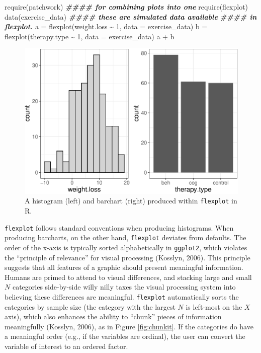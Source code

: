 \documentclass[
  english,
  man]{apa6}
\newenvironment{Shaded}{\begin{snugshade}}{\end{snugshade}}
\newcommand{\AttributeTok}[1]{\textcolor[rgb]{0.77,0.63,0.00}{#1}}
\newcommand{\DecValTok}[1]{\textcolor[rgb]{0.00,0.00,0.81}{#1}}
\newcommand{\DocumentationTok}[1]{\textcolor[rgb]{0.56,0.35,0.01}{\textbf{\textit{#1}}}}
\newcommand{\FunctionTok}[1]{\textcolor[rgb]{0.00,0.00,0.00}{#1}}
\newcommand{\NormalTok}[1]{#1}
\newcommand{\OtherTok}[1]{\textcolor[rgb]{0.56,0.35,0.01}{#1}}
\newcommand{\SpecialCharTok}[1]{\textcolor[rgb]{0.00,0.00,0.00}{#1}}
\begin{document}
\begin{Shaded}
\begin{Highlighting}[]
\FunctionTok{require}\NormalTok{(patchwork) }\DocumentationTok{\#\#\#\# for combining plots into one}
\FunctionTok{require}\NormalTok{(flexplot)}
\FunctionTok{data}\NormalTok{(exercise\_data) }\DocumentationTok{\#\#\#\# these are simulated data available }
                    \DocumentationTok{\#\#\#\# in flexplot. }
\NormalTok{a }\OtherTok{=} \FunctionTok{flexplot}\NormalTok{(weight.loss }\SpecialCharTok{\textasciitilde{}} \DecValTok{1}\NormalTok{, }\AttributeTok{data =}\NormalTok{ exercise\_data)}
\NormalTok{b }\OtherTok{=} \FunctionTok{flexplot}\NormalTok{(therapy.type }\SpecialCharTok{\textasciitilde{}} \DecValTok{1}\NormalTok{, }\AttributeTok{data =}\NormalTok{ exercise\_data)}
\NormalTok{a }\SpecialCharTok{+}\NormalTok{ b}
\end{Highlighting}
\end{Shaded}

\begin{figure}
\centering
\includegraphics{flexplot_psychmeth_files/figure-latex/bar-1.pdf}
\caption{\label{fig:bar}A histogram (left) and barchart (right) produced within \texttt{flexplot} in R.}
\end{figure}

\normalsize

\texttt{flexplot} follows standard conventions when producing histograms. When producing barcharts, on the other hand, \texttt{flexplot} deviates from defaults. The order of the x-axis is typically sorted alphabetically in \texttt{ggplot2}, which violates the ``principle of relevance'' for visual processing (Kosslyn, 2006). This principle suggests that all features of a graphic should present meaningful information. Humans are primed to attend to visual differences, and stacking large and small \(N\) categories side-by-side willy nilly taxes the visual processing system into believing these differences are meaningful. \texttt{flexplot} automatically sorts the categories by sample size (the category with the largest \(N\) is left-most on the \(X\) axis), which also enhances the ability to ``chunk'' pieces of information meaningfully (Kosslyn, 2006), as in Figure \ref{fig:chunkit}. If the categories do have a meaningful order (e.g., if the variables are ordinal), the user can convert the variable of interest to an ordered factor.
\end{document}
